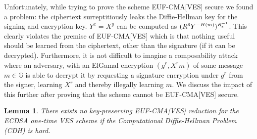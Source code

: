 \documentclass[fullpage]{article}
\newtheorem{lemma}{Lemma}[section]
\theoremstyle{definition}
\newcommand{\EUFCMAVES}{\textsf{EUF-CMA}[\textsf{VES}]\xspace}
\newcommand{\hatSigma}{\hat{\Sigma}}
\newcommand{\G}{\mathbb{G}}
\begin{document}
Unfortunately, while trying to prove the scheme \EUFCMAVES secure we found a problem: the ciphertext surreptitiously leaks the Diffie-Hellman key for the signing and encryption key. $Y^x = X^y$ can be computed as $(R^{\hat{s}}Y^{-H(m)})^{R_\texttt{x}^{-1}}$. This clearly violates the premise of \EUFCMAVES which is that nothing useful should be learned from the ciphertext, other than the signature (if it can be decrypted). Furthermore, it is not difficult to imagine a composability attack where an adversary, with an ElGamal encryption $(g^r, X^rm)$ of some message $m \in \G$ is able to decrypt it by requesting a signature encryption under $g^r$ from the signer, learning $X^r$ and thereby illegally learning $m$. We discuss the impact of this further after proving that the scheme cannot be \EUFCMAVES secure.

\begin{lemma}
\label{ecdsa-ves-not-secure}
There exists no \emph{key-preserving} \EUFCMAVES reduction for the ECDSA one-time VES scheme if the Computational Diffie-Hellman Problem (CDH) is hard.
\end{lemma}

\newcommand{\ECDSAVES}{\hatSigma_{\text{ECDSA}}}
\newcommand{\CDH}{\textsf{CDH}}
\newcommand{\Sim}{\mathcal{S}}
\end{document}
